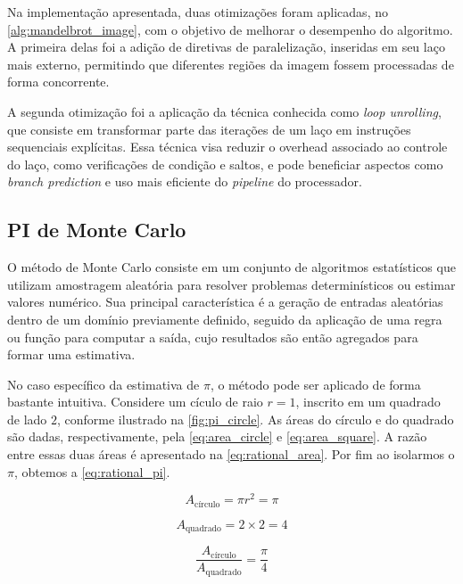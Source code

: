 Na implementação apresentada, duas otimizações foram aplicadas, no \autoref{alg:mandelbrot_image}, com o objetivo de melhorar o desempenho do algoritmo. A primeira delas foi a adição de diretivas de paralelização, inseridas em seu laço mais externo, permitindo que diferentes regiões da imagem fossem processadas de forma concorrente.

A segunda otimização foi a aplicação da técnica conhecida como \textit{loop unrolling}, que consiste em transformar parte das iterações de um laço em instruções sequenciais explícitas. Essa técnica visa reduzir o overhead associado ao controle do laço, como verificações de condição e saltos, e pode beneficiar aspectos como \textit{branch prediction} e uso mais eficiente do \textit{pipeline} do processador.

\subsection{PI de Monte Carlo}\label{subsec:pi}

O método de Monte Carlo consiste em um conjunto de algoritmos estatísticos que utilizam amostragem aleatória para resolver problemas determinísticos ou estimar valores numérico. Sua principal característica é a geração de entradas aleatórias dentro de um domínio previamente definido, seguido da aplicação de uma regra ou função para computar a saída, cujo resultados são então agregados para formar uma estimativa.

No caso específico da estimativa de $\pi$, o método pode ser aplicado de forma bastante intuitiva. Considere um cículo de raio $r = 1$, inscrito em um quadrado de lado $2$, conforme ilustrado na \autoref{fig:pi_circle}. As áreas do círculo e do quadrado são dadas, respectivamente, pela \autoref{eq:area_circle} e \autoref{eq:area_square}. A razão entre essas duas áreas é apresentado na \autoref{eq:rational_area}. Por fim ao isolarmos o $\pi$, obtemos a \autoref{eq:rational_pi}.

\begin{equation}
	\label{eq:area_circle}
	A_{\text{círculo}} = \pi r^2 = \pi
\end{equation}

\begin{equation}
	\label{eq:area_square}
	A_{\text{quadrado}} = 2 \times 2 = 4
\end{equation}

\begin{equation}
	\label{eq:rational_area}
	\frac{A_{\text{círculo}}}{A_{\text{quadrado}}} = \frac{\pi}{4}
\end{equation}

